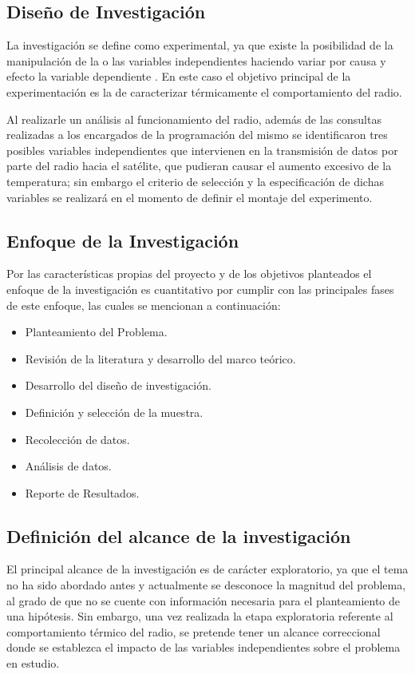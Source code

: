 \subsection{Diseño de Investigación}

La investigación se define como experimental, ya que existe la posibilidad de la manipulación de la o las variables independientes haciendo variar por causa y efecto la variable dependiente \cite{meto}. En este caso el objetivo principal de la experimentación es la de caracterizar térmicamente el comportamiento del radio.

Al realizarle un análisis al funcionamiento del radio, además de las consultas realizadas a los encargados de la programación del mismo se identificaron tres posibles variables independientes que intervienen en la transmisión de datos por parte del radio hacia el satélite, que pudieran causar el aumento excesivo de la temperatura; sin embargo el criterio de selección y la especificación de dichas variables se realizará en el momento de definir el montaje del experimento.

\subsection{Enfoque de la Investigación}

Por las características propias del proyecto y de los objetivos planteados el enfoque de la investigación es cuantitativo por cumplir con las principales fases de este enfoque, las cuales se mencionan a continuación: \cite{meto}

\begin{itemize}
    \item Planteamiento del Problema.
    \item Revisión de la literatura y desarrollo del marco teórico.
    \item Desarrollo del diseño de investigación.
    \item Definición y selección de la muestra. 
    \item Recolección de datos.
    \item Análisis de datos.
    \item Reporte de Resultados.
\end{itemize}

\subsection{Definición del alcance de la investigación}

El principal  alcance de la investigación es de carácter exploratorio, ya que el tema no ha sido abordado antes  y actualmente se desconoce la magnitud del problema, al grado de que no se cuente con información necesaria para el planteamiento de una hipótesis. Sin embargo, una vez realizada la etapa exploratoria  referente al comportamiento térmico del radio, se pretende tener un alcance correccional donde se establezca el impacto de las variables independientes sobre el problema en estudio. \cite{meto}

